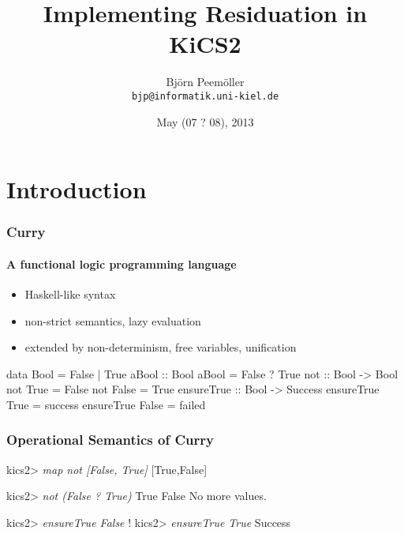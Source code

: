 \documentclass[
,xcolor=dvipsnames
]{beamer}
\title{Implementing Residuation in KiCS2}
\date{May (07 ? 08), 2013}
\author[Björn Peemöller]{\texorpdfstring
{Björn Peemöller\\\texttt{bjp@informatik.uni-kiel.de}}
{Björn Peemöller}
}
\institute{Kiel University}
\begin{document}
\begin{frame}
\titlepage
\end{frame}


\section{Introduction}

\begin{frame}[fragile]%
\frametitle{Curry}
\framesubtitle{A functional logic programming language}

\begin{itemize}
\item Haskell-like syntax
\item non-strict semantics, lazy evaluation
\item extended by non-determinism, free variables, unification
\end{itemize}

\begin{curry}
data Bool = False | True \medskip
aBool :: Bool
aBool = False ? True \medskip
not :: Bool -> Bool
not True  = False
not False = True \medskip
ensureTrue :: Bool -> Success
ensureTrue True  = success
ensureTrue False = failed
\end{curry}
\end{frame}

\begin{frame}[fragile]%
\frametitle{Operational Semantics of Curry}

\begin{kics2}
kics2> \textsl{map not [False, True]}
[True,False]
\end{kics2}
\pause
\begin{kics2}
kics2> \textsl{not (False ? True)}
True
False
No more values.
\end{kics2}
\pause
\begin{kics2}
kics2> \textsl{ensureTrue False}
!
kics2> \textsl{ensureTrue True}
Success
\end{kics2}
\end{frame}
\end{document}
